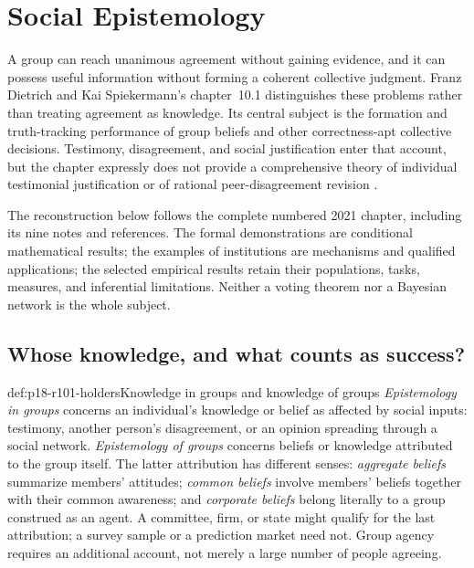 \chapter{Social Epistemology}
\label{sec:p18-rationality-10-1}

A group can reach unanimous agreement without gaining evidence, and it
can possess useful information without forming a coherent collective
judgment. Franz Dietrich and Kai Spiekermann's chapter~10.1 distinguishes
these problems rather than treating agreement as knowledge. Its central
subject is the formation and truth-tracking performance of group beliefs
and other correctness-apt collective decisions. Testimony, disagreement,
and social justification enter that account, but the chapter expressly
does not provide a comprehensive theory of individual testimonial
justification or of rational peer-disagreement revision
\parencite[pp.~579--580 and n.~1, p.~586]{DietrichSpiekermann2021Social}.

The reconstruction below follows the complete numbered 2021 chapter,
including its nine notes and references. The formal demonstrations are
conditional mathematical results; the examples of institutions are
mechanisms and qualified applications; the selected empirical results
retain their populations, tasks, measures, and inferential limitations.
Neither a voting theorem nor a Bayesian network is the whole subject.

\section{Whose knowledge, and what counts as success?}
\label{sec:p18-r101-scope}

\begin{hbdefinition}{def:p18-r101-holders}{Knowledge in groups and knowledge of groups}
\emph{Epistemology in groups} concerns an individual's knowledge or
belief as affected by social inputs: testimony, another person's
disagreement, or an opinion spreading through a social network.
\emph{Epistemology of groups} concerns beliefs or knowledge attributed
to the group itself. The latter attribution has different senses:
\emph{aggregate beliefs} summarize members' attitudes;
\emph{common beliefs} involve members' beliefs together with their
common awareness; and \emph{corporate beliefs} belong literally to a
group construed as an agent. A committee, firm, or state might qualify
for the last attribution; a survey sample or a prediction market need
not. Group agency requires an additional account, not merely a large
number of people agreeing.
\end{hbdefinition}

